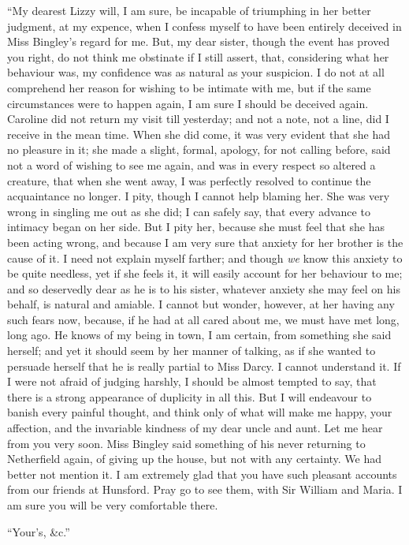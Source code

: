 \begin{letter}
“My dearest Lizzy will, I am sure, be incapable of
triumphing in her better judgment, at my expence, when
I confess myself to have been entirely deceived in Miss
Bingley’s regard for me. But, my dear sister, though
the event has proved you right, do not think me obstinate
if I still assert, that, considering what her behaviour was,
my confidence was as natural as your suspicion. I do
not at all comprehend her reason for wishing to be intimate
with me, but if the same circumstances were to happen
again, I am sure I should be deceived again. Caroline
did not return my visit till yesterday; and not a note,
not a line, did I receive in the mean time. When she did
come, it was very evident that she had no pleasure in it;
she made a slight, formal, apology, for not calling before,
said not a word of wishing to see me again, and was in
every respect so altered a creature, that when she went
away, I was perfectly resolved to continue the acquaintance
no longer. I pity, though I cannot help blaming her.
She was very wrong in singling me out as she did; I can
safely say, that every advance to intimacy began on her
side. But I pity her, because she must feel that she has
been acting wrong, and because I am very sure that
anxiety for her brother is the cause of it. I need not
explain myself farther; and though \textit{we} know this anxiety
to be quite needless, yet if she feels it, it will easily account
for her behaviour to me; and so deservedly dear as he
is to his sister, whatever anxiety she may feel on his
behalf, is natural and amiable. I cannot but wonder,
however, at her having any such fears now, because, if
he had at all cared about me, we must have met long,
long ago. He knows of my being in town, I am certain,
from something she said herself; and yet it should seem
by her manner of talking, as if she wanted to persuade
herself that he is really partial to Miss Darcy. I cannot
understand it. If I were not afraid of judging harshly,
I should be almost tempted to say, that there is a strong
appearance of duplicity in all this. But I will endeavour
to banish every painful thought, and think only of what
will make me happy, your affection, and the invariable
kindness of my dear uncle and aunt. Let me hear from
you very soon. Miss Bingley said something of his never
returning to Netherfield again, of giving up the house,
but not with any certainty. We had better not mention it.
I am extremely glad that you have such pleasant accounts
from our friends at Hunsford. Pray go to see them, with
Sir William and Maria. I am sure you will be very
comfortable there.

\raggedleft “Your’s, \&c.”
\end{letter}

